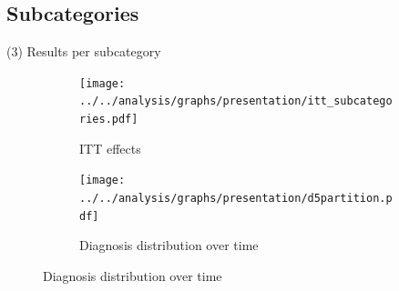 \documentclass[aspectratio=169,handout]{beamer} %
\newcommand\mynum[1]{%
  \usebeamercolor{enumerate item}%
  \tikzset{beameritem/.style={circle,inner sep=0,minimum size=2ex,text=enumerate item.bg,fill=enumerate item.fg,font=\footnotesize}}%
  \tikz[baseline=(n.base)]\node(n)[beameritem]{#1};%
}	%
\begin{document}
%
%
%	
%	





%
%
%
%

\subsection{Subcategories}
\begin{frame}{(3) Results per subcategory}
\begin{figure}\centering
\begin{subfigure}[h]{0.49\linewidth}\centering\caption{ITT effects}
	\texttt{[image: ../../analysis/graphs/presentation/itt\_subcategories.pdf]}
\end{subfigure}
\begin{subfigure}[h]{0.49\linewidth}\centering\caption{Diagnosis distribution over time}
	\texttt{[image: ../../analysis/graphs/presentation/d5partition.pdf]}
\end{subfigure}
\end{figure}


\end{frame}
\end{document}
